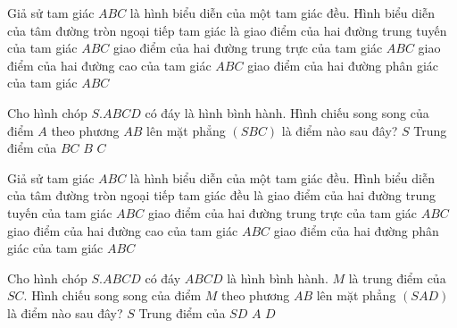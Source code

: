 \begin{ex}%
	Giả sử tam giác $ABC$ là hình biểu diễn của một tam giác đều. Hình biểu diễn  của tâm đường tròn ngoại tiếp tam giác là
	\choice 
		 {\True giao điểm của hai đường trung tuyến của tam giác $ABC$}
		 {giao điểm của hai đường trung trực của tam giác $ABC$}
		{giao  điểm của hai đường cao của tam giác $ABC$}
		{giao điểm  của hai đường phân giác của tam giác $ABC$}
\end{ex}

\begin{ex}%
	Cho hình chóp $S.ABCD$ có đáy là hình bình hành. Hình chiếu song  song của điểm $A$ theo phương $AB$ lên mặt phẳng $(SBC)$ là điểm nào sau đây?
	 \choice
		 {$S$}
		{Trung điểm của $BC$} 
		 {\True $B$}
		{$C$} 
\end{ex}

\begin{ex}%
	Giả sử tam giác $ABC$ là hình biểu diễn của một tam giác đều. Hình biểu diễn  của tâm đường tròn ngoại tiếp tam giác đều là
	\choice 
		{giao điểm của hai đường trung tuyến của tam  giác $ABC$}
		{\True  giao điểm của hai đường trung trực của tam giác $ABC$}
		{giao điểm của hai đường cao của tam giác  $ABC$}
		 {giao điểm của hai đường phân giác của tam giác $ABC$}
\end{ex}

\begin{ex}%
	Cho hình chóp $S.ABCD$ có đáy $ABCD$ là hình bình hành. $M$ là trung điểm của $SC$. Hình chiếu song song của điểm $M$ theo phương $AB$ lên mặt phẳng $(SAD)$ là điểm  nào sau đây?
	 \choice
		{$S$} 
		 {\True Trung điểm của $SD$}
		 {$A$}
		 {$D$}
\end{ex}


